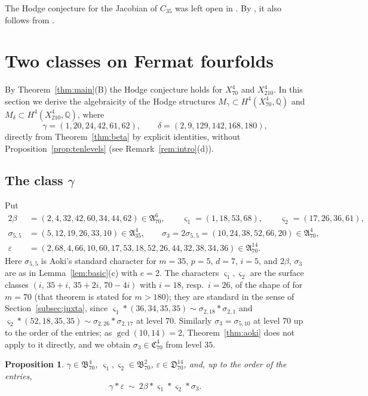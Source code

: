 \documentclass[11pt]{amsart}
\newtheorem{proposition}[theorem]{Proposition}
\theoremstyle{definition}
\theoremstyle{remark}
\numberwithin{equation}{section}
\newcommand{\Q}{\mathbb{Q}}
\newcommand{\fA}{\mathfrak{A}}
\newcommand{\fB}{\mathfrak{B}}
\newcommand{\fC}{\mathfrak{C}}
\newcommand{\fD}{\mathfrak{D}}
\begin{document}
The Hodge conjecture for the Jacobian of $C_{35}$ was left open in \cite[Example~8.6]{Ao02}. By \cite[Cor.~3.2]{Ao00}, it also follows from \cite[Thm.~1.1]{MMMV26}.

\section{Two classes on Fermat fourfolds}\label{sec:examples}

By Theorem~\ref{thm:main}(B) the Hodge conjecture holds for $X^4_{70}$ and $X^4_{210}$. In this section we derive the algebraicity of the Hodge structures $M_\gamma\subset H^4(X^4_{70},\Q)$ and $M_\delta\subset H^4(X^4_{210},\Q)$, where
\[
\gamma=(1,20,24,42,61,62),\qquad \delta=(2,9,129,142,168,180),
\]
directly from Theorem~\ref{thm:beta} by explicit identities, without Proposition~\ref{prop:tenlevels} (see Remark~\ref{rem:intro}(d)).

\subsection{\texorpdfstring{The class $\gamma$}{The class gamma}}\label{subsec:gamma}
Put
\[
\begin{aligned}
2\beta&=(2,4,32,42,60,34,44,62)\in\fA^6_{70},\qquad \varsigma_1=(1,18,53,68),\qquad \varsigma_2=(17,26,36,61),\\
\sigma_{5,5}&=(5,12,19,26,33,10)\in\fA^4_{35},\qquad \sigma_3=2\sigma_{5,5}=(10,24,38,52,66,20)\in\fA^4_{70},\\
\varepsilon&=(2,68,4,66,10,60,17,53,18,52,26,44,32,38,34,36)\in\fA^{14}_{70}.
\end{aligned}
\]
Here $\sigma_{5,5}$ is Aoki's standard character for $m=35$, $p=5$, $d=7$, $i=5$, and $2\beta$, $\sigma_3$ are as in Lemma~\ref{lem:basic}(c) with $e=2$. The characters $\varsigma_1,\varsigma_2$ are the surface classes $(i,\,35+i,\,35+2i,\,70-4i)$ with $i=18$, resp.\ $i=26$, of the shape of \cite[Thm.~C(ii)]{Ao83} for $m=70$ (that theorem is stated for $m>180$); they are standard in the sense of Section~\ref{subsec:juxta}, since $\varsigma_1*(36,34,35,35)\sim\sigma_{2,18}*\sigma_{2,1}$ and $\varsigma_2*(52,18,35,35)\sim\sigma_{2,26}*\sigma_{2,17}$ at level $70$. Similarly $\sigma_3=\sigma_{5,10}$ at level $70$ up to the order of the entries; as $\gcd(10,14)=2$, Theorem~\ref{thm:aoki} does not apply to it directly, and we obtain $\sigma_3\in\fC^4_{70}$ from level $35$.

\begin{proposition}\label{prop:gammaid}
$\gamma\in\fB^4_{70}$, $\varsigma_1,\varsigma_2\in\fB^2_{70}$, $\varepsilon\in\fD^{14}_{70}$, and, up to the order of the entries,
\[
\gamma*\varepsilon\ \sim\ 2\beta*\varsigma_1*\varsigma_2*\sigma_3 .
\]
\end{proposition}
\end{document}
